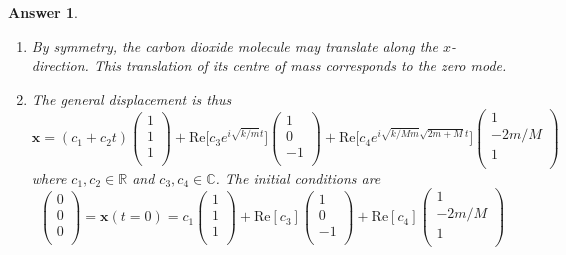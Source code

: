 \documentclass[a4paper]{article}
\newtheorem{ans}{Answer}[section]
\theoremstyle{new}
\begin{document}
\begin{ans}
\begin{enumerate}[label=(\roman*)]
which has solutions $\omega^2=0$, $\omega^2=\frac{k}{m}$ and $\omega^2=\frac{k}{mM}(2m+M)$. Their corresponding eigenvectors are $(1,1,1)^T$, $(1,0,-1)^T$ and $(1,-2\frac{m}{M},1)^T$.
\item By symmetry, the carbon dioxide molecule may translate along the $x$-direction. This translation of its centre of mass corresponds to the zero mode.
\item The general displacement is thus 
$$\mathbf{x}=(c_1+c_2t)\begin{pmatrix}1\\1\\1\\\end{pmatrix}+\text{Re}\bigg[c_3e^{i\sqrt{k/m}t}\bigg]\begin{pmatrix}1\\0\\-1\\\end{pmatrix}+\text{Re}\bigg[c_4e^{i\sqrt{k/Mm}\sqrt{2m+M}t}\bigg]\begin{pmatrix}1\\-2m/M\\1\\\end{pmatrix}$$
where $c_1,c_2\in\mathbb{R}$ and $c_3,c_4\in\mathbb{C}$. The initial conditions are
$$\begin{pmatrix}0\\0\\0\\\end{pmatrix}=\mathbf{x}(t=0)=c_1\begin{pmatrix}1\\1\\1\\\end{pmatrix}+\text{Re}[c_3]\begin{pmatrix}1\\0\\-1\\\end{pmatrix}+\text{Re}[c_4]\begin{pmatrix}1\\-2m/M\\1\\\end{pmatrix}$$

\end{enumerate}
\end{ans}
\end{document}
